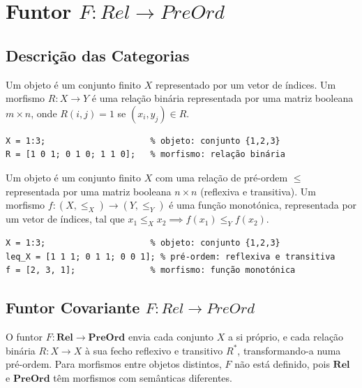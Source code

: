 \section{Funtor \texorpdfstring{$F: Rel \to PreOrd$}{F: Rel -> PreOrd}}
\label{sec:functor-rel-preord}

\subsection{Descrição das Categorias}

\begin{definition}
Um objeto é um conjunto finito $X$ representado por um vetor de índices. Um morfismo $R: X \to Y$ é uma relação binária representada por uma matriz booleana $m \times n$, onde $R(i,j) = 1$ se $(x_i, y_j) \in R$.
\end{definition}

\begin{lstlisting}[style=matlab, caption={Objeto e morfismo em $\mathbf{Rel}$}]
X = 1:3;                     % objeto: conjunto {1,2,3}
R = [1 0 1; 0 1 0; 1 1 0];   % morfismo: relação binária
\end{lstlisting}

\begin{definition}
Um objeto é um conjunto finito $X$ com uma relação de pré-ordem $\leq$ representada por uma matriz booleana $n \times n$ (reflexiva e transitiva). Um morfismo $f: (X, \leq_X) \to (Y, \leq_Y)$ é uma função monotónica, representada por um vetor de índices, tal que $x_1 \leq_X x_2 \implies f(x_1) \leq_Y f(x_2)$.
\end{definition}

\begin{lstlisting}[style=matlab, caption={Objeto e morfismo em $\mathbf{PreOrd}$}]
X = 1:3;                     % objeto: conjunto {1,2,3}
leq_X = [1 1 1; 0 1 1; 0 0 1]; % pré-ordem: reflexiva e transitiva
f = [2, 3, 1];               % morfismo: função monotónica
\end{lstlisting}


\subsection{Funtor Covariante \texorpdfstring{$F: Rel \to PreOrd$}{F: Rel -> PreOrd - (Fechamento Reflexivo-Transitivo)}}

O funtor $F: \mathbf{Rel} \to \mathbf{PreOrd}$ envia cada conjunto $X$ a si próprio, e cada relação binária $R: X \to X$ à sua fecho reflexivo e transitivo $R^*$, transformando-a numa pré-ordem. Para morfismos entre objetos distintos, $F$ não está definido, pois $\mathbf{Rel}$ e $\mathbf{PreOrd}$ têm morfismos com semânticas diferentes.

